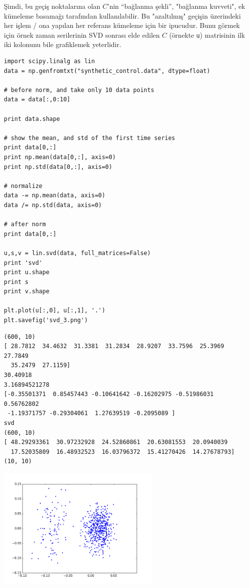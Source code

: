 \documentclass[12pt,fleqn]{article}\usepackage{../../common}
\begin{document}
Şimdi, bu geçiş noktalarına olan $C$'nin ``bağlanma şekli'', "bağlanma kuvveti",
ek kümeleme basamağı tarafından kullanılabilir. Bu "azaltılmış" geçişin
üzerindeki her işlem / ona yapılan her referans kümeleme için bir ipucudur. Bunu
görmek için örnek zaman serilerinin SVD sonrası elde edilen $C$ (örnekte
\verb!u!) matrisinin ilk iki kolonunu bile grafiklemek yeterlidir.

\begin{verbatim}
import scipy.linalg as lin
data = np.genfromtxt("synthetic_control.data", dtype=float)

# before norm, and take only 10 data points
data = data[:,0:10]

print data.shape

# show the mean, and std of the first time series
print data[0,:]
print np.mean(data[0,:], axis=0)
print np.std(data[0,:], axis=0)

# normalize
data -= np.mean(data, axis=0)
data /= np.std(data, axis=0)

# after norm
print data[0,:]

u,s,v = lin.svd(data, full_matrices=False)
print 'svd'
print u.shape
print s
print v.shape

plt.plot(u[:,0], u[:,1], '.')
plt.savefig('svd_3.png')
\end{verbatim}

\begin{verbatim}
(600, 10)
[ 28.7812  34.4632  31.3381  31.2834  28.9207  33.7596  25.3969  27.7849
  35.2479  27.1159]
30.40918
3.16894521278
[-0.35501371  0.85457443 -0.10641642 -0.16202975 -0.51986031  0.56762802
 -1.19371757 -0.29304061  1.27639519 -0.2095089 ]
svd
(600, 10)
[ 48.29293361  30.97232928  24.52860861  20.63081553  20.0940039
  17.52035809  16.48932523  16.03796372  15.41270426  14.27678793]
(10, 10)
\end{verbatim}

\includegraphics[height=6cm]{svd_3.png}
\end{document}
